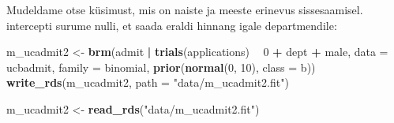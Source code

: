 \documentclass[]{book}
\newenvironment{Shaded}{\begin{snugshade}}{\end{snugshade}}
\newcommand{\CommentTok}[1]{\textcolor[rgb]{0.56,0.35,0.01}{\textit{#1}}}
\newcommand{\DataTypeTok}[1]{\textcolor[rgb]{0.13,0.29,0.53}{#1}}
\newcommand{\DecValTok}[1]{\textcolor[rgb]{0.00,0.00,0.81}{#1}}
\newcommand{\FloatTok}[1]{\textcolor[rgb]{0.00,0.00,0.81}{#1}}
\newcommand{\KeywordTok}[1]{\textcolor[rgb]{0.13,0.29,0.53}{\textbf{#1}}}
\newcommand{\NormalTok}[1]{#1}
\newcommand{\OperatorTok}[1]{\textcolor[rgb]{0.81,0.36,0.00}{\textbf{#1}}}
\newcommand{\StringTok}[1]{\textcolor[rgb]{0.31,0.60,0.02}{#1}}
\begin{document}
\begin{Shaded}
\end{Shaded}

Mudeldame otse küsimust, mis on naiste ja meeste erinevus sissesaamisel.
intercepti surume nulli, et saada eraldi hinnang igale departmendile:

\begin{Shaded}
\begin{Highlighting}[]
\NormalTok{m_ucadmit2 <-}\StringTok{ }\KeywordTok{brm}\NormalTok{(admit }\OperatorTok{|}\StringTok{ }\KeywordTok{trials}\NormalTok{(applications) }\OperatorTok{~}\StringTok{ }\DecValTok{0} \OperatorTok{+}\StringTok{ }\NormalTok{dept }\OperatorTok{+}\StringTok{ }\NormalTok{male,}
                  \DataTypeTok{data =}\NormalTok{ ucbadmit, }
                  \DataTypeTok{family =}\NormalTok{ binomial,}
                  \KeywordTok{prior}\NormalTok{(}\KeywordTok{normal}\NormalTok{(}\DecValTok{0}\NormalTok{, }\DecValTok{10}\NormalTok{), }\DataTypeTok{class =}\NormalTok{ b))}
\KeywordTok{write_rds}\NormalTok{(m_ucadmit2, }\DataTypeTok{path =} \StringTok{"data/m_ucadmit2.fit"}\NormalTok{)}
\end{Highlighting}
\end{Shaded}

\begin{Shaded}
\begin{Highlighting}[]
\NormalTok{m_ucadmit2 <-}\StringTok{ }\KeywordTok{read_rds}\NormalTok{(}\StringTok{"data/m_ucadmit2.fit"}\NormalTok{)}
\end{Highlighting}
\end{Shaded}
\end{document}
